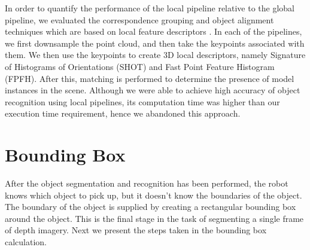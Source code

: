 \documentclass[journal]{IEEEtran}
\begin{document}
In order to quantify the performance of the local pipeline relative to the global pipeline, we evaluated the correspondence grouping and object alignment techniques which are based on local feature descriptors \cite{aligning} \cite{aldoma3}.  In each of the pipelines, we first downsample the point cloud, and then take the keypoints associated with  them.  We then use the keypoints to create 3D local descriptors, namely Signature of Histograms of Orientations (SHOT) and Fast Point Feature Histogram (FPFH). After this, matching is performed to determine the presence of model instances in the scene.
Although we were able to achieve high accuracy of object recognition using local pipelines, its computation time was higher than our execution time requirement, hence we abandoned this approach.

\section{Bounding Box}
After the object segmentation and recognition has been performed, the robot knows which object to pick up, but it doesn't know the boundaries of the object. The boundary of the object is supplied by creating a rectangular bounding box around the object.  This is the final stage in the task of segmenting a single frame of depth imagery.  Next we present the steps taken in the bounding box calculation.
\end{document}
